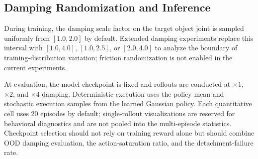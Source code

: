 \subsection{Damping Randomization and Inference}
\label{app:dyn}

During training, the damping scale factor on the target object joint
is sampled uniformly from $[1.0, 2.0]$ by default. Extended damping
experiments replace this interval with $[1.0, 4.0]$, $[1.0, 2.5]$,
or $[2.0, 4.0]$ to analyze the boundary of training-distribution
variation; friction randomization is not enabled in the current
experiments.

At evaluation, the model checkpoint is fixed and rollouts are
conducted at $\times1$, $\times2$, and $\times4$ damping. Deterministic execution
uses the policy mean and stochastic execution samples from the
learned Gaussian policy. Each quantitative cell uses 20 episodes by
default; single-rollout visualizations are reserved for behavioral
diagnostics and are not pooled into the multi-episode statistics.
Checkpoint selection should not rely on training reward alone but
should combine OOD damping evaluation, the action-saturation ratio,
and the detachment-failure rate.
